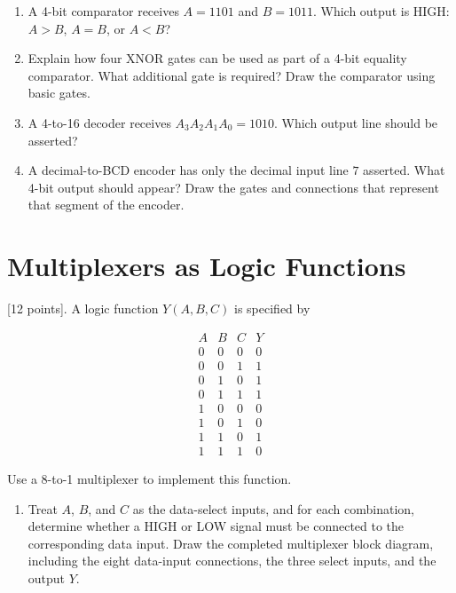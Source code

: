 \documentclass[10pt]{article}
\begin{document}
\begin{enumerate}
\item A 4-bit comparator receives $A=1101$ and $B=1011$.  Which output is HIGH: $A>B$, $A=B$, or $A<B$? \\ \vspace{0.5cm}
\item Explain how four XNOR gates can be used as part of a 4-bit equality comparator. What additional gate is required? Draw the comparator using basic gates.  \\ \vspace{1.5cm}
\item A 4-to-16 decoder receives $A_3A_2A_1A_0=1010$.  Which output line should be asserted? \\ \vspace{0.5cm}
\item A decimal-to-BCD encoder has only the decimal input line $7$ asserted. What 4-bit output should appear? Draw the gates and connections that represent that segment of the encoder.  \\ \vspace{2cm}
\end{enumerate}

\section{Multiplexers as Logic Functions}

[12 points]. A logic function $Y(A,B,C)$ is specified by

\[
\begin{array}{ccc|c}
A&B&C&Y\\ \hline
0&0&0&0\\
0&0&1&1\\
0&1&0&1\\
0&1&1&1\\
1&0&0&0\\
1&0&1&0\\
1&1&0&1\\
1&1&1&0
\end{array}
\]

Use a 8-to-1 multiplexer to implement this function.

\begin{enumerate}
\item Treat $A$, $B$, and $C$ as the data-select inputs, and for each combination, determine whether a HIGH or LOW signal must be connected to the corresponding data input.  Draw the completed multiplexer block diagram, including the eight data-input connections, the three select inputs, and the output $Y$. \\ \vspace{5cm}
\end{enumerate}
\end{document}

